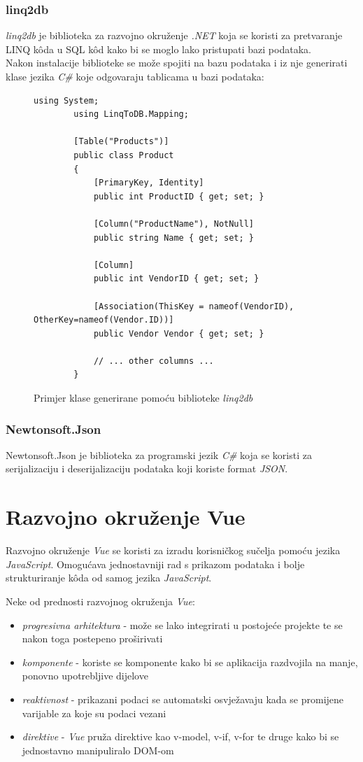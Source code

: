 \documentclass[zavrsnirad]{fer}
\begin{document}
\subsubsection{linq2db}
\label{pog:linq2db}
\textit{linq2db} je biblioteka za razvojno okruženje \textit{.NET} koja se koristi za pretvaranje LINQ kôda u SQL kôd kako bi se moglo lako pristupati bazi podataka.
\\Nakon instalacije biblioteke se može spojiti na bazu podataka i iz nje generirati klase jezika \textit{C\#} koje odgovaraju tablicama u bazi podataka:
\begin{figure}[htp]
	\centering
	\begin{lstlisting}[language=CSharp]
		using System;
		using LinqToDB.Mapping;
		
		[Table("Products")]
		public class Product
		{
			[PrimaryKey, Identity]
			public int ProductID { get; set; }
			
			[Column("ProductName"), NotNull]
			public string Name { get; set; }
			
			[Column]
			public int VendorID { get; set; }
			
			[Association(ThisKey = nameof(VendorID), OtherKey=nameof(Vendor.ID))]
			public Vendor Vendor { get; set; }
			
			// ... other columns ...
		}
	\end{lstlisting}
	\caption{Primjer klase generirane pomoću biblioteke \textit{linq2db} \cite{linq2db_doc}}
\end{figure}
\FloatBarrier

\subsubsection{Newtonsoft.Json}
Newtonsoft.Json je biblioteka za programski jezik \textit{C\#} koja se koristi za serijalizaciju i deserijalizaciju podataka koji koriste format \textit{JSON}.

\section{Razvojno okruženje Vue}
\label{pog:vue}
Razvojno okruženje \textit{Vue} se koristi za izradu korisničkog sučelja pomoću jezika \textit{JavaScript}. Omogućava jednostavniji rad s prikazom podataka i bolje strukturiranje kôda od samog jezika \textit{JavaScript}.

Neke od prednosti razvojnog okruženja \textit{Vue}:
\begin{itemize}
	\item \textit{progresivna arhitektura} - može se lako integrirati u postojeće projekte te se nakon toga postepeno proširivati
	\item \textit{komponente} - koriste se komponente kako bi se aplikacija razdvojila na manje, ponovno upotrebljive dijelove
	\item \textit{reaktivnost} - prikazani podaci se automatski osvježavaju kada se promijene varijable za koje su podaci vezani
	\item \textit{direktive} - \textit{Vue} pruža direktive kao v-model, v-if, v-for te druge kako bi se jednostavno manipuliralo DOM-om
\end{itemize}
\end{document}
